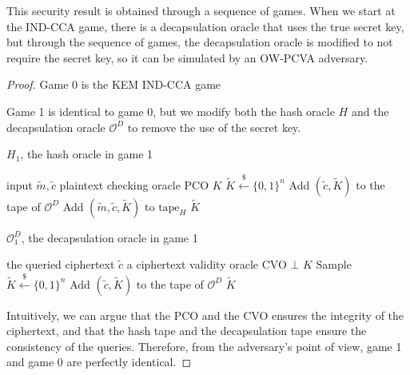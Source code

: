 \documentclass{article}
\newcommand{\leftsample}{\overset{{\scriptscriptstyle\$}}{\leftarrow}}
\begin{document}
This security result is obtained through a sequence of games. When we start at the IND-CCA game, there is a decapsulation oracle that uses the true secret key, but through the sequence of games, the decapsulation oracle is modified to not require the secret key, so it can be simulated by an OW-PCVA adversary.

\begin{proof}\label{ind-cca-kem-proof}
    Game 0 is the KEM IND-CCA game

    Game 1 is identical to game 0, but we modify both the hash oracle $H$ and the decapsulation oracle $\mathcal{O}^D$ to remove the use of the secret key.

    \begin{algorithm}
        \caption{$H_1$, the hash oracle in game 1}
        \begin{algorithmic}[1]
            \Require input $\tilde{m}, \tilde{c}$
            \Require plaintext checking oracle PCO
                \State \Return $K$
            \EndIf
            \State $\tilde{K} \leftsample \{0, 1\}^n$
                \State Add $(\tilde{c}, \tilde{K})$ to the tape of $\mathcal{O}^D$
            \EndIf
            \State Add $(\tilde{m}, \tilde{c}, \tilde{K})$ to $\text{tape}_H$
            \State \Return $\tilde{K}$
        \end{algorithmic}
    \end{algorithm}

    \begin{algorithm}
        \caption{$\mathcal{O}^D_1$, the decapsulation oracle in game 1}
        \begin{algorithmic}[1]
            \Require the queried ciphertext $\tilde{c}$
            \Require a ciphertext validity oracle CVO
                \State \Return $\bot$
            \EndIf
                \State \Return $K$
            \EndIf
            \State Sample $\tilde{K} \leftsample \{0, 1\}^n$ 
            \State Add $(\tilde{c}, \tilde{K})$ to the tape of $\mathcal{O}^D$
            \State \Return $\tilde{K}$
        \end{algorithmic}
    \end{algorithm}
    \pagebreak

    Intuitively, we can argue that the PCO and the CVO ensures the integrity of the ciphertext, and that the hash tape and the decapsulation tape ensure the consistency of the queries. Therefore, from the adversary's point of view, game 1 and game 0 are perfectly identical.


\end{proof}
\end{document}
